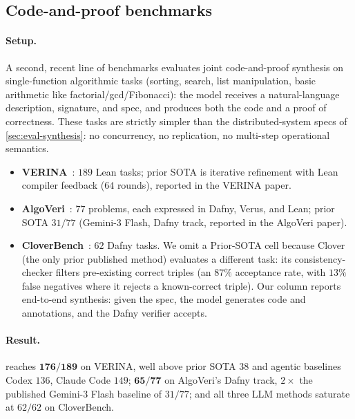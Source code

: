 \subsection{Code-and-proof benchmarks}

\paragraph{Setup.}
A second, recent line of benchmarks evaluates joint code-and-proof synthesis on single-function algorithmic tasks (sorting, search, list manipulation, basic arithmetic like factorial/gcd/Fibonacci): the model receives a natural-language description, signature, and spec, and produces both the code and a proof of correctness. These tasks are strictly simpler than the distributed-system specs of \cref{sec:eval-synthesis}: no concurrency, no replication, no multi-step operational semantics.
\begin{itemize}
\item \textbf{VERINA}~\cite{verina}: $189$ Lean tasks; prior SOTA is iterative refinement with Lean compiler feedback ($64$ rounds), reported in the VERINA paper.
\item \textbf{AlgoVeri}~\cite{algoveri}: $77$ problems, each expressed in Dafny, Verus, and Lean; prior SOTA $31/77$ (Gemini-3 Flash, Dafny track, reported in the AlgoVeri paper).
\item \textbf{CloverBench}~\cite{clover}: $62$ Dafny tasks. We omit a Prior-SOTA cell because Clover (the only prior published method) evaluates a different task: its consistency-checker filters pre-existing correct triples (an $87\%$ acceptance rate, with $13\%$ false negatives where it rejects a known-correct triple). Our column reports end-to-end synthesis: given the spec, the model generates code and annotations, and the Dafny verifier accepts.
\end{itemize}

\paragraph{Result.}
\sys{} reaches $\mathbf{176/189}$ on VERINA, well above prior SOTA $38$ and agentic baselines Codex $136$, Claude Code $149$; $\mathbf{65/77}$ on AlgoVeri's Dafny track, $2\times$ the published Gemini-3 Flash baseline of $31/77$; and all three LLM methods saturate at $62/62$ on CloverBench.
